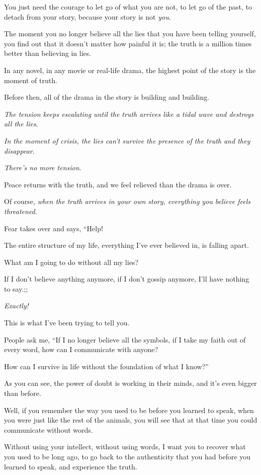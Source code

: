 \documentclass{article}
\numberwithin{equation}{section}
\begin{document}
You just need the courage to let go of what you are not, to let go of the past, to detach from your story, because your story is not \textit{you}.

The moment you no longer believe all the lies that you have been telling yourself, you find out that it doesn't matter how painful it is; the truth is a million times better than believing in lies.

%
In any novel, in any movie or real-life drama, the highest point of the story is the moment of truth.

Before then, all of the drama in the story is building and building.

\textit{The tension keeps escalating until the truth arrives like a tidal wave and destroys all the lies}.

\textit{In the moment of crisis, the lies can't survive the presence of the truth and they disappear}.

\textit{There's no more tension}.

Peace returns with the truth, and we feel relieved than the drama is over.

%
Of course, \textit{when the truth arrives in your own story, everything you believe feels threatened}.

Fear takes over and says, ``Help!

The entire structure of my life, everything I've ever believed in, is falling apart.

What am I going to do without all my lies?

If I don't believe anything anymore, if I don't gossip anymore, I'll have nothing to say.;;

\textit{Exactly!}

This is what I've been trying to tell you.

People ask me, ``If I no longer believe all the symbols, if I take my faith out of every word, how can I communicate with anyone?

How can I survive in life without the foundation of what I know?''

As you can see, the power of doubt is working in their minds, and it's even bigger than before.

%
Well, if you remember the way you used to be before you learned to speak, when you were just like the rest of the animals, you will see that at that time you could communicate without words.

Without using your intellect, without using words, I want you to recover what you used to be long ago, to go back to the authenticity that you had before you learned to speak, and experience the truth.
\end{document}
